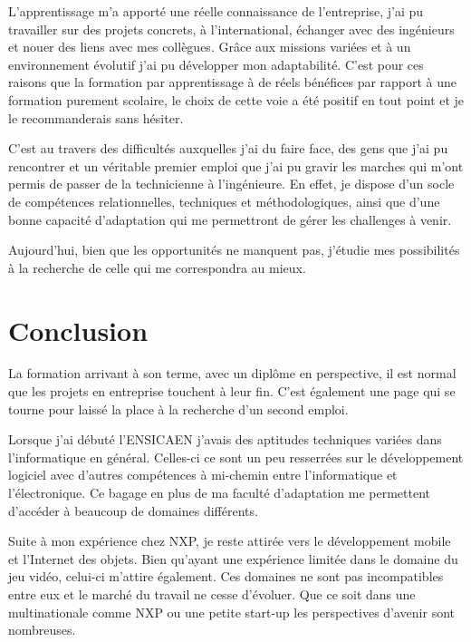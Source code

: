 \documentclass[french,12pt,a4paper,titlepage,openright,openbib]{report}
\begin{document}
L'apprentissage m'a apporté une réelle connaissance de l'entreprise, j'ai pu travailler sur des projets concrets, à l'international, échanger avec des ingénieurs et nouer des liens avec mes collègues. Grâce aux missions variées et à un environnement évolutif j'ai pu développer mon adaptabilité.
C'est pour ces raisons que la formation par apprentissage à de réels bénéfices par rapport à une formation purement scolaire, le choix de cette voie a été positif en   tout point et je le recommanderais sans hésiter.

C'est au travers des difficultés auxquelles j'ai du faire face, des gens que j'ai pu rencontrer et un véritable premier emploi que j'ai pu gravir les marches qui m'ont permis de passer de la technicienne à l'ingénieure. En effet, je dispose d'un socle de compétences relationnelles, techniques et méthodologiques, ainsi que d'une bonne capacité d'adaptation qui me permettront de gérer les challenges à venir.

Aujourd'hui, bien que les opportunités ne manquent pas, j'étudie mes possibilités à la recherche de celle qui me correspondra au mieux. 

\chapter{Conclusion}

La formation arrivant à son terme, avec un diplôme en perspective, il est normal que les projets en entreprise touchent à leur fin. C'est également une page qui se tourne pour laissé la place à la recherche d'un second emploi.

Lorsque j'ai débuté l'ENSICAEN j'avais des aptitudes techniques variées dans l'informatique en général. Celles-ci ce sont un peu resserrées sur le développement logiciel avec d'autres compétences à mi-chemin entre l'informatique et l'électronique. Ce bagage en plus de ma faculté d'adaptation me permettent d'accéder à beaucoup de domaines différents.

Suite à mon expérience chez NXP, je reste attirée vers le développement mobile et l'Internet des objets. Bien qu'ayant une expérience limitée dans le domaine du jeu vidéo, celui-ci m'attire également. Ces domaines ne sont pas incompatibles entre eux et le marché du travail ne cesse d'évoluer. Que ce soit dans une multinationale comme NXP ou une petite start-up les perspectives d'avenir sont nombreuses.


\printglossary[title={Glossaire}]

{}

	
\end{document}
